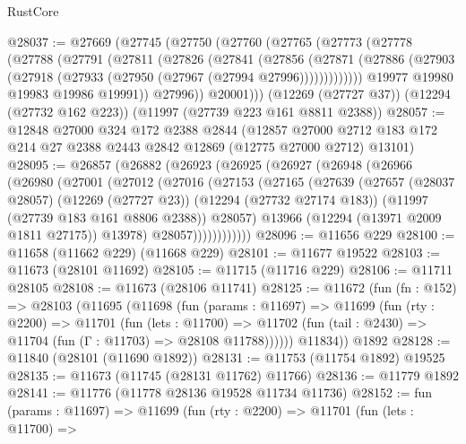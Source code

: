 \begin{lexlean}{RustCore}
\begin{coremodule}
@28037 := @27669
    (@27745
      (@27750
        (@27760
          (@27765
            (@27773
              (@27778
                (@27788
                  (@27791
                    (@27811
                      (@27826
                        (@27841
                          (@27856
                            (@27871
                              (@27886
                                (@27903 (@27918 (@27933 (@27950 (@27967 (@27994 @27996)))))))))))))
                  @19977
                  @19980
                  @19983
                  @19986
                  @19991))
              @27996))
          @20001)))
    (@12269 (@27727 @37))
    (@12294 (@27732 @162 @223))
    (@11997 (@27739 @223 @161 @8811 @2388))
@28057 := @12848
    @27000
    @324
    @172
    @2388
    @2844
    (@12857 @27000 @2712 @183 @172 @214 @27 @2388 @2443 @2842 @12869 (@12775 @27000 @2712) @13101)
@28095 := @26857
    (@26882
      (@26923
        (@26925
          (@26927
            (@26948
              (@26966
                (@26980
                  (@27001
                    (@27012
                      (@27016
                        (@27153
                          (@27165
                            (@27639
                              (@27657
                                (@28037 @28057)
                                (@12269 (@27727 @23))
                                (@12294 (@27732 @27174 @183))
                                (@11997 (@27739 @183 @161 @8806 @2388))
                                @28057)
                              @13966
                              (@12294 (@13971 @2009 @1811 @27175))
                              @13978)
                            @28057))))))))))))
@28096 := @11656 @229
@28100 := @11658 (@11662 @229) (@11668 @229)
@28101 := @11677 @19522
@28103 := @11673 (@28101 @11692)
@28105 := @11715 (@11716 @229)
@28106 := @11711 @28105
@28108 := @11673 (@28106 @11741)
@28125 := @11672
    (fun (fn : @152) =>
    @28103
      (@11695
        (@11698
          (fun (params : @11697) =>
          @11699
            (fun (rty : @2200) =>
            @11701
              (fun (lets : @11700) =>
              @11702 (fun (tail : @2430) => @11704 (fun (Γ : @11703) => @28108 @11788))))))
        @11834))
    @1892
@28128 := @11840 (@28101 (@11690 @1892))
@28131 := @11753 (@11754 @1892) @19525
@28135 := @11673 (@11745 (@28131 @11762) @11766)
@28136 := @11779 @1892
@28141 := @11776 (@11778 @28136 @19528 @11734 @11736)
@28152 := fun (params : @11697) =>
  @11699
    (fun (rty : @2200) =>
    @11701
      (fun (lets : @11700) =>

\end{coremodule}
\end{lexlean}
